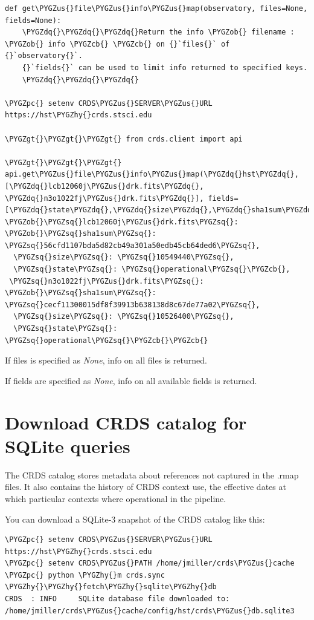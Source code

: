 \documentclass[letterpaper,10pt,english]{sphinxmanual}
\def\PYGZus{\char`\_}
\def\PYGZob{\char`\{}
\def\PYGZcb{\char`\}}
\def\PYGZgt{\char`\>}
\def\PYGZpc{\char`\%}
\def\PYGZhy{\char`\-}
\def\PYGZsq{\char`\'}
\def\PYGZdq{\char`\"}
\renewcommand\PYGZsq{\textquotesingle}
\begin{document}
\begin{Verbatim}[commandchars=\\\{\}]
def get\PYGZus{}file\PYGZus{}info\PYGZus{}map(observatory, files=None, fields=None):
    \PYGZdq{}\PYGZdq{}\PYGZdq{}Return the info \PYGZob{} filename : \PYGZob{} info \PYGZcb{} \PYGZcb{} on {}`files{}` of {}`observatory{}`.
    {}`fields{}` can be used to limit info returned to specified keys.
    \PYGZdq{}\PYGZdq{}\PYGZdq{}

\PYGZpc{} setenv CRDS\PYGZus{}SERVER\PYGZus{}URL https://hst\PYGZhy{}crds.stsci.edu

\PYGZgt{}\PYGZgt{}\PYGZgt{} from crds.client import api

\PYGZgt{}\PYGZgt{}\PYGZgt{} api.get\PYGZus{}file\PYGZus{}info\PYGZus{}map(\PYGZdq{}hst\PYGZdq{}, [\PYGZdq{}lcb12060j\PYGZus{}drk.fits\PYGZdq{}, \PYGZdq{}n3o1022fj\PYGZus{}drk.fits\PYGZdq{}], fields=[\PYGZdq{}state\PYGZdq{},\PYGZdq{}size\PYGZdq{},\PYGZdq{}sha1sum\PYGZdq{}])
\PYGZob{}\PYGZsq{}lcb12060j\PYGZus{}drk.fits\PYGZsq{}: \PYGZob{}\PYGZsq{}sha1sum\PYGZsq{}: \PYGZsq{}56cfd1107bda5d82cb49a301a50edb45cb64ded6\PYGZsq{},
  \PYGZsq{}size\PYGZsq{}: \PYGZsq{}10549440\PYGZsq{},
  \PYGZsq{}state\PYGZsq{}: \PYGZsq{}operational\PYGZsq{}\PYGZcb{},
 \PYGZsq{}n3o1022fj\PYGZus{}drk.fits\PYGZsq{}: \PYGZob{}\PYGZsq{}sha1sum\PYGZsq{}: \PYGZsq{}cecf11300015df8f39913b638138d8c67de77a02\PYGZsq{},
  \PYGZsq{}size\PYGZsq{}: \PYGZsq{}10526400\PYGZsq{},
  \PYGZsq{}state\PYGZsq{}: \PYGZsq{}operational\PYGZsq{}\PYGZcb{}\PYGZcb{}
\end{Verbatim}

If files is specified as \emph{None},  info on all files is returned.

If fields are specified as \emph{None},  info on all available fields is returned.


\section{Download CRDS catalog for SQLite queries}
\label{database:download-crds-catalog-for-sqlite-queries}
The CRDS catalog stores metadata about references not captured in the .rmap files.   It also contains
the history of CRDS context use,  the effective dates at which particular contexts where operational in
the pipeline.

You can download a SQLite-3 snapshot of the CRDS catalog like this:

\begin{Verbatim}[commandchars=\\\{\}]
\PYGZpc{} setenv CRDS\PYGZus{}SERVER\PYGZus{}URL https://hst\PYGZhy{}crds.stsci.edu
\PYGZpc{} setenv CRDS\PYGZus{}PATH /home/jmiller/crds\PYGZus{}cache
\PYGZpc{} python \PYGZhy{}m crds.sync \PYGZhy{}\PYGZhy{}fetch\PYGZhy{}sqlite\PYGZhy{}db
CRDS  : INFO     SQLite database file downloaded to: /home/jmiller/crds\PYGZus{}cache/config/hst/crds\PYGZus{}db.sqlite3
\end{Verbatim}
\end{document}
